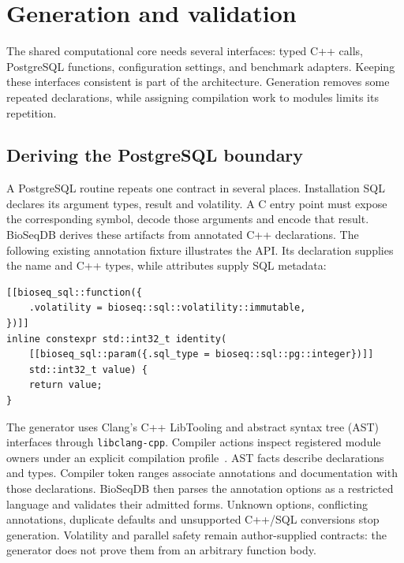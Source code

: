 \section{Generation and validation}
\label{sec:arch-generation}

The shared computational core needs several interfaces: typed C++ calls,
PostgreSQL functions, configuration settings, and benchmark adapters. Keeping
these interfaces consistent is part of the architecture. Generation removes
some repeated declarations, while assigning compilation work to modules
limits its repetition.

\subsection{Deriving the PostgreSQL boundary}
\label{sec:arch-sql-generation}

A PostgreSQL routine repeats one contract in several places. Installation SQL
declares its argument types, result and volatility. A C entry point must expose
the corresponding symbol, decode those arguments and encode that result.
BioSeqDB derives these artifacts from annotated C++ declarations. The following
existing annotation fixture illustrates the API. Its declaration supplies the
name and C++ types, while attributes supply SQL metadata:

\noindent\begin{minipage}{\linewidth}
\begin{lstlisting}[style=bioseq-cpp26,basicstyle=\footnotesize\ttfamily,
  caption={A typed declaration with SQL metadata.},
  label={lst:arch-sql-annotation}]
[[bioseq_sql::function({
    .volatility = bioseq::sql::volatility::immutable,
})]]
inline constexpr std::int32_t identity(
    [[bioseq_sql::param({.sql_type = bioseq::sql::pg::integer})]]
    std::int32_t value) {
    return value;
}
\end{lstlisting}
\end{minipage}

The generator uses Clang's C++ LibTooling and abstract syntax tree (AST) interfaces through
\texttt{libclang-cpp}. Compiler actions inspect registered module owners under
an explicit compilation profile~\autocite{clang_libtooling,clang_tooling_interfaces}.
AST facts describe declarations and types. Compiler token ranges associate
annotations and documentation with those declarations.
BioSeqDB then parses the annotation options as a restricted language and
validates their admitted forms. Unknown options, conflicting annotations,
duplicate defaults and unsupported C++/SQL conversions stop generation.
Volatility and parallel safety remain author-supplied contracts: the generator
does not prove them from an arbitrary function body.

